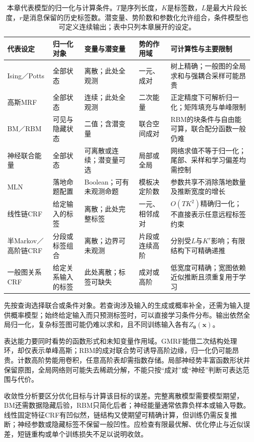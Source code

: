 \begin{table}[htbp]
  \centering
  \small
  \begin{tabularx}{\linewidth}{p{27mm}p{19mm}p{24mm}p{24mm}X}
    \toprule
    代表设定 & 归一化对象 & 变量与潜变量 & 势的作用域 & 可计算性与主要限制\\
    \midrule
    Ising／Potts & 全部状态 & 离散；此处全观测 & 一元、成对 & 树上精确；一般图的全局求和与强耦合采样可能昂贵\\
    高斯MRF & 全部状态 & 连续；此处全观测 & 二次能量 & 正定精度下可解析归一化；矩阵填充与单峰限制\\
    BM／RBM & 可见与隐藏状态 & 二值；含潜变量 & 联合空间成对 & RBM的块条件与自由能可算，联合配分函数一般仍难\\
    神经联合能量 & 全部状态 & 可离散或连续；潜变量可选 & 局部或全局 & 网络求值不等于归一化；尾部、采样和学习偏差均需控制\\
    MLN & 落地命题配置 & Boolean；可有未观测命题 & 模板决定阶数 & 参数共享不消除落地数量及推断宽度的增长\\
    线性链CRF & 给定输入的标签 & 离散；此处完整标签 & 一元、相邻成对 & $O(TK^2)$精确归一化；不直接表示任意远程标签约束\\
    半Markov／高阶链CRF & 分段或标签组合 & 离散；边界可未观测 & 片段或连续高阶 & 分别受$L$与$K^r$影响；有限结构下可精确递推\\
    一般图关系CRF & 给定关系输入的标签 & 此处离散；标签可缺失 & 成对或高阶 & 低宽度可精确；宽图依赖近似推断且须重复用于学习\\
    \bottomrule
  \end{tabularx}
  \caption{本章代表模型的归一化与计算条件。$T$是序列长度，$K$是标签数，$L$是最大片段长度，$r$是消息保留的历史标签数。潜变量、势阶数和参数化允许组合，条件模型也可定义连续输出；表中只列本章展开的设定。}
  \label{tab:pgm-energy-models-comparison}
\end{table}

先按查询选择联合或条件对象。若查询涉及输入的生成或概率补全，还需为输入提供概率模型；始终给定输入而只预测标签时，可以直接学习条件分布。输出依然全局归一化，复杂标签图可能仍难以求和，且不同训练输入各有$Z_{\bm{\theta}}(\bm{x})$。

表达能力要同时看势的函数形式和未知变量作用域。GMRF能借二次结构处理环，却仅表示单峰高斯；RBM的成对联合势可诱导高阶边缘，归一化仍可能昂贵。计数高阶势能用卷积，任意高阶表却需指数存储。局部神经势丰富函数形状并保留原图，全局网络则可能失去稀疏分解，不能只按“成对”或“神经”判断可表达范围与代价。

收敛性分析要区分优化目标与计算该目标的误差。完整离散模型需要模型期望，BM还需数据隐藏后验，RBM只简化后者；神经能量通常依靠负样本或输入导数。线性固定特征CRF有凹似然，链结构又使期望可精确计算，但训练仍需反复推断；神经参数或隐藏标签不保留一般凹性。应检查有限最优解、优化停止与近似误差，短链重构或单个训练损失不足以说明收敛。

